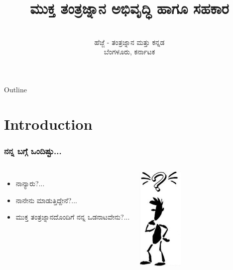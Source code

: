 \documentclass[slidestop,compress,brown]{beamer}
\title[\tiny{\en{FLOSS Development and Contribution}}]{ಮುಕ್ತ ತಂತ್ರಜ್ನಾನ ಅಭಿವೃದ್ಧಿ ಹಾಗೂ ಸಹಕಾರ}
\author[ವಾಸು]{\en{Vasudev Kamath}}
\institute[\en{Debian}]{}
\date[ಹೆಜ್ಜೆ, ಬೆಂಗಳೂರು, ಕರ್ನಾಟಕ]{\en{January 22, 2012}\\
  ಹೆಜ್ಜೆ - ತಂತ್ರಜ್ನಾನ ಮತ್ತು ಕನ್ನಡ\\
  ಬೆಂಗಳೂರು, ಕರ್ನಾಟಕ}
\newcommand\en[1]{{\english #1}}
\begin{document}
\begin{frame}
  \titlepage
\end{frame}  

\begin{frame}{\en{Outline}}
  \tableofcontents
\end{frame}

\section{\en{Introduction}}
\begin{frame}
  \frametitle{ನನ್ನ ಬಗ್ಗೆ ಒಂದಿಷ್ಟು...}
  \begin{columns}[c]
    \begin{itemize}    
    \item<2-> ನಾನ್ಯಾರು?...\\
    \item<3-> ನಾನೇನು ಮಾಡುತ್ತಿದ್ದೇನೆ?...\\
    \item<4-> ಮುಕ್ತ ತಂತ್ರಜ್ನಾನದೊಂದಿಗೆ ನನ್ನ ಒಡನಾಟವೇನು?...\\
    \end{itemize}
    \includegraphics[height=5cm,keepaspectratio]{who-am-i}
  \end{columns}
\end{frame}

\end{document}
